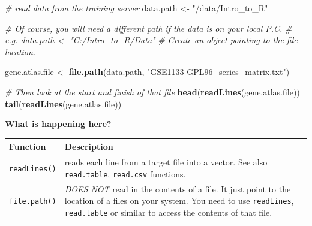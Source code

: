 \documentclass[a4paper]{book}
\newenvironment{Shaded}{\begin{snugshade}}{\end{snugshade}}
\newcommand{\KeywordTok}[1]{\textcolor[rgb]{0.13,0.29,0.53}{\textbf{{#1}}}}
\newcommand{\StringTok}[1]{\textcolor[rgb]{0.31,0.60,0.02}{{#1}}}
\newcommand{\CommentTok}[1]{\textcolor[rgb]{0.56,0.35,0.01}{\textit{{#1}}}}
\newcommand{\NormalTok}[1]{{#1}}
\renewenvironment{Shaded}
{\vspace{1.5em}\begin{leftbar}\begin{snugshade}}
{\end{snugshade}\end{leftbar}\vspace{3pt}}
\begin{document}
\begin{Shaded}
\begin{Highlighting}[]
\CommentTok{# read data from the training server}
\NormalTok{data.path <-}\StringTok{ "/data/Intro_to_R"}

\CommentTok{# Of course, you will need a different path if the data is on your local P.C.}
\CommentTok{# e.g. data.path <- "C:/Intro_to_R/Data"}
\CommentTok{# Create an object pointing to the file location.}

\NormalTok{gene.atlas.file <-}\StringTok{ }\KeywordTok{file.path}\NormalTok{(data.path, }\StringTok{"GSE1133-GPL96_series_matrix.txt"}\NormalTok{)}

\CommentTok{# Then look at the start and finish of that file}
\KeywordTok{head}\NormalTok{(}\KeywordTok{readLines}\NormalTok{(gene.atlas.file))}
\KeywordTok{tail}\NormalTok{(}\KeywordTok{readLines}\NormalTok{(gene.atlas.file))}
\end{Highlighting}
\end{Shaded}

\textbf{What is happening here?}

\begin{longtable}[]{@{}ll@{}}
\toprule
\begin{minipage}[b]{0.14\columnwidth}\raggedright\strut
Function\strut
\end{minipage} & \begin{minipage}[b]{0.80\columnwidth}\raggedright\strut
Description\strut
\end{minipage}\tabularnewline
\midrule
\endhead
\begin{minipage}[t]{0.14\columnwidth}\raggedright\strut
\texttt{readLines()}\strut
\end{minipage} & \begin{minipage}[t]{0.80\columnwidth}\raggedright\strut
reads each line from a target file into a vector. See also
\texttt{read.table}, \texttt{read.csv} functions.\strut
\end{minipage}\tabularnewline
\begin{minipage}[t]{0.14\columnwidth}\raggedright\strut
\texttt{file.path()}\strut
\end{minipage} & \begin{minipage}[t]{0.80\columnwidth}\raggedright\strut
\emph{DOES NOT} read in the contents of a file. It just point to the
location of a files on your system. You need to use \texttt{readLines},
\texttt{read.table} or similar to access the contents of that
file.\strut
\end{minipage}\tabularnewline
\bottomrule
\end{longtable}
\end{document}
